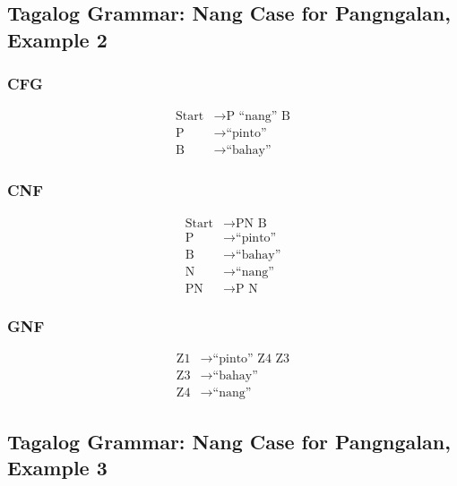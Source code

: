 \newpage
\subsection{Tagalog Grammar: Nang Case for Pangngalan, Example 2}
\subsubsection{CFG}
\begin{equation*}
    \begin{aligned}
        \text{Start}   & \rightarrow \text{P “nang” B}   \\
        \text{P} & \rightarrow \text{“pinto”} \\
        \text{B} & \rightarrow \text{“bahay”}
    \end{aligned}
\end{equation*}

\subsubsection{CNF}
\begin{equation*}
    \begin{aligned}
        \text{Start}   & \rightarrow \text{PN B}   \\
        \text{P} & \rightarrow \text{“pinto”} \\
        \text{B} & \rightarrow \text{“bahay”} \\
        \text{N} & \rightarrow \text{“nang”} \\
        \text{PN} & \rightarrow \text{P N}
    \end{aligned}
\end{equation*}

\subsubsection{GNF}
\begin{equation*}
    \begin{aligned}
        \text{Z1}   & \rightarrow \text{“pinto” Z4 Z3}   \\
        \text{Z3} & \rightarrow \text{“bahay”} \\
        \text{Z4} & \rightarrow \text{“nang”}
    \end{aligned}
\end{equation*}

\newpage
\subsection{Tagalog Grammar: Nang Case for Pangngalan, Example 3}
